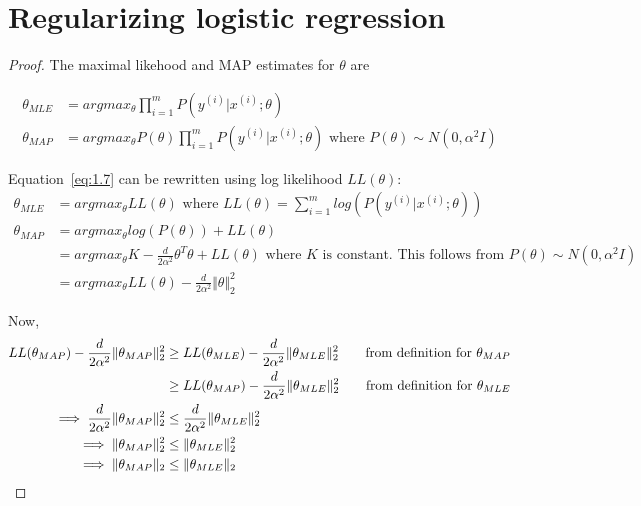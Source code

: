 \documentclass{article}
\begin{document}
\section{Regularizing logistic regression}
\begin{proof}
The maximal likehood and MAP estimates for $\theta$ are

\newcommand{\thetaMAP}{\theta_{MAP}}
\newcommand{\thetaMLE}{\theta_{MLE}}

\begin{equation}
  \label{eq:1.7}
  \begin{split}
  \thetaMLE &= argmax_{\theta}\prod_{i=1}^m P(y^{(i)} | x^{(i)} ; \theta) \\
  \thetaMAP &= argmax_{\theta}P(\theta)\prod_{i=1}^m P(y^{(i)} | x^{(i)} ; \theta) \text{ where } P(\theta) \sim N(0,\alpha^2I)
  \end{split}
\end{equation}

Equation~\ref{eq:1.7} can be rewritten using log likelihood $LL(\theta)$:
\begin{equation}
  \label{eq:1.8}
  \begin{split}
  \thetaMLE &= argmax_{\theta}LL(\theta) \text{ where } LL(\theta) = \sum_{i=1}^m log(P(y^{(i)} | x^{(i)} ; \theta)) \\
  \thetaMAP &= argmax_{\theta} log(P(\theta)) + LL(\theta) \\
            &= argmax_{\theta} K - \frac{d}{2\alpha^2}\theta^T\theta + LL(\theta) \text{ where $K$ is constant. This follows from $P(\theta) \sim N(0,\alpha^2I)$}\\
            &= argmax_{\theta}  LL(\theta) - \frac{d}{2\alpha^2}\Vert \theta \Vert_2^2
  \end{split}
\end{equation}


Now,
\begin{equation}
  \label{eq:1.9}
  \begin{split}
   LL(\thetaMAP) - \frac{d}{2\alpha^2}\Vert \thetaMAP \Vert_2^2 &\geq    LL(\thetaMLE) - \frac{d}{2\alpha^2}\Vert \thetaMLE \Vert_2^2 \text{\qquad from definition for $\thetaMAP$} \\
                                                                &\geq    LL(\thetaMAP) - \frac{d}{2\alpha^2}\Vert \thetaMLE \Vert_2^2 \text{\qquad from definition for $\thetaMLE$} \\
   \implies \frac{d}{2\alpha^2}\Vert \thetaMAP \Vert_2^2 &\leq \frac{d}{2\alpha^2}\Vert \thetaMLE \Vert_2^2 \\
   \implies \Vert \thetaMAP \Vert_2^2 &\leq \Vert \thetaMLE \Vert_2^2 \\
   \implies \Vert \thetaMAP \Vert_2 &\leq \Vert \thetaMLE \Vert_2 
  \end{split}
\end{equation}
\end{proof}
\end{document}
